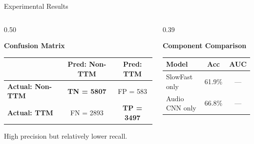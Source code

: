 \documentclass[aspectratio=169, 10pt]{beamer}
\begin{document}
\begin{frame}{Experimental Results}
\begin{columns}[T,onlytextwidth]
\begin{column}{0.50\textwidth}
\vspace{3pt}

\textcolor{NavyBlue}{\small\bfseries Confusion Matrix}

\vspace{2pt}

\scriptsize

\begin{tabular}{@{}lcc@{}}

\toprule

\rowcolor{NavyBlue}
& \color{white}\small Pred: Non-TTM
& \color{white}\small Pred: TTM \\

\midrule

\rowcolor{CardGreen}
\small\bfseries Actual: Non-TTM &
\cellcolor{CardGreen}\textbf{TN = 5807} &
\cellcolor{CardOrange}FP = 583 \\

\rowcolor{CardOrange}
\small\bfseries Actual: TTM &
\cellcolor{CardOrange}FN = 2893 &
\cellcolor{CardGreen}\textbf{TP = 3497} \\

\bottomrule

\end{tabular}

\vspace{2pt}

{\scriptsize\color{MidText}
High precision but relatively lower recall.}

\end{column}

\begin{column}{0.39\textwidth}

\textcolor{NavyBlue}{\small\bfseries Component Comparison}

\vspace{2pt}

\scriptsize

\begin{tabular}{@{}lcc@{}}

\toprule

\rowcolor{NavyBlue}
\color{white}\small Model &
\color{white}\small Acc &
\color{white}\small AUC \\

\midrule

\rowcolor{CardOrange}
SlowFast only & 61.9\% & --- \\

Audio CNN only & 66.8\% & --- \\


\end{tabular}
\end{column}
\end{columns}
\end{frame}
\end{document}
